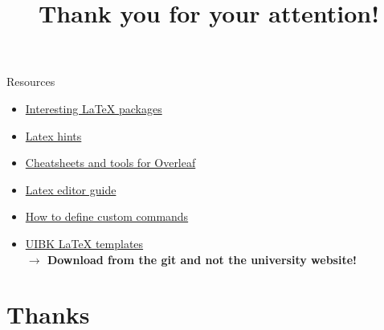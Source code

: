 \documentclass[11pt,t,usepdftitle=false,aspectratio=169]{beamer}
\begin{document}
\begin{frame}{Resources}
	\begin{itemize}
		\item \href{https://blog.martisak.se/2020/05/03/top-ten-latex-packages/}{Interesting LaTeX packages}
     \item \href{https://www.hmc.edu/mathematics/wp-content/uploads/sites/49/2019/06/latex-hints.pdf}{Latex hints} \\ 
	\item \href{https://guides.lib.chalmers.se/overleaf_latex/tools}{Cheatsheets and tools for Overleaf}
	\item \href{https://typeset.io/resources/the-only-latex-editor-guide-you-will-need/}{Latex editor guide} \\
	\item \href{https://waterprogramming.wordpress.com/2021/10/05/make-latex-easier-with-custom-commands/}{How to define custom commands}
	\item \href{https://git.uibk.ac.at/uibklatex/beamer\_letter}{UIBK LaTeX templates} \\ \textbf{$\rightarrow$ Download from the git and not the university website!}
\end{itemize}
\end{frame}




\title{Thank you for your attention!}
\subtitle{}
\section{Thanks}
\end{document}
